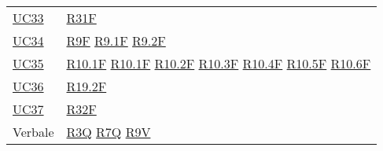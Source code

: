 \begin{center}
\begin{longtable}[!h]{m{50px} m{50px}}
        \hyperref[sec:UC33]{UC33}         & \hyperref[tab:RequisitiFunzionali]{R31F}    \\

        \hyperref[sec:UC34]{UC34}         & \hyperref[tab:RequisitiFunzionali]{R9F}
        \newline \hyperref[tab:RequisitiFunzionali]{R9.1F}
        \newline \hyperref[tab:RequisitiFunzionali]{R9.2F}                              \\

        \hyperref[sec:UC35]{UC35}         & \hyperref[tab:RequisitiFunzionali]{R10.1F}
        \newline \hyperref[tab:RequisitiFunzionali]{R10.1F}
        \newline \hyperref[tab:RequisitiFunzionali]{R10.2F}
        \newline \hyperref[tab:RequisitiFunzionali]{R10.3F}
        \newline \hyperref[tab:RequisitiFunzionali]{R10.4F}
        \newline \hyperref[tab:RequisitiFunzionali]{R10.5F}
        \newline \hyperref[tab:RequisitiFunzionali]{R10.6F}                             \\

        \hyperref[sec:UC36]{UC36}         & \hyperref[tab:RequisitiFunzionali]{R19.2F}  \\
        \hyperref[sec:UC37]{UC37}         & \hyperref[tab:RequisitiFunzionali]{R32F}    \\

        Verbale                           & \hyperref[tab:RequisitiQualita]{R3Q}
        \newline \hyperref[tab:RequisitiQualita]{R7Q}
        \newline \hyperref[tab:RequisitiQualita]{R9V}                                   \\
    \end{longtable}
\end{center}

